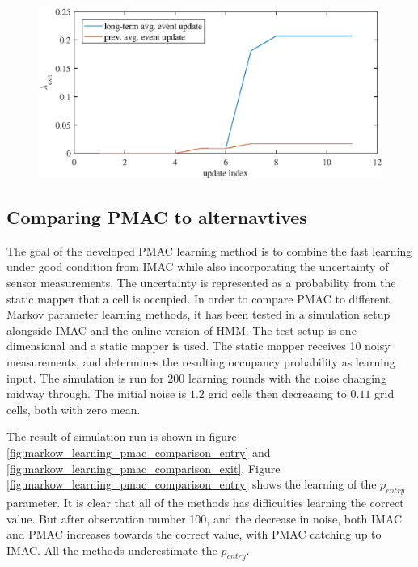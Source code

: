 \begin{figure}[htbp]
    \centering
    \includegraphics[scale=1]{chapters/mapping_of_dynamic_areas/figures/visualization_of_advantage_long_term_average}
    \caption{}
    \label{fig:visualization_of_advantage_long_term_average}
\end{figure}


\subsection{Comparing PMAC to alternavtives}
The goal of the developed PMAC learning method is to combine the fast learning under good condition from IMAC while also incorporating the uncertainty of sensor measurements. The uncertainty is represented as a probability from the static mapper that a cell is occupied. In order to compare PMAC to different Markov parameter learning methods, it has been tested in a simulation setup alongside IMAC and the online version of HMM. The test setup is one dimensional and a static mapper is used. The static mapper receives 10 noisy measurements, and determines the resulting occupancy probability as learning input. The simulation is run for 200 learning rounds with the noise changing midway through. The initial noise is \(1.2\) grid cells then decreasing to \(0.11\) grid cells, both with zero mean. 

The result of simulation run is shown in figure \ref{fig:markow_learning_pmac_comparison_entry} and \ref{fig:markow_learning_pmac_comparison_exit}. Figure  \ref{fig:markow_learning_pmac_comparison_entry} shows the learning of the \(p_{entry}\) parameter. It is clear that all of the methods has difficulties learning the correct value. But after observation number 100, and the decrease in noise, both IMAC and PMAC increases towards the correct value, with PMAC catching up to IMAC. All the methods underestimate the \(p_{entry}\).


